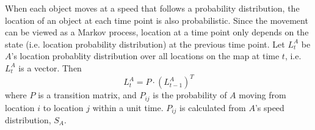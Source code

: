 When each object moves at a speed that follows a probability distribution,
the location of an object at each time point is also probabilistic. Since
the movement can be viewed as a Markov process, location at a time point only
depends on the state (i.e. location probability distribution) at the 
previous time point. Let $L_t^A$ be $A$'s location probablity distribution
over all locations on the map at time $t$, i.e. $L_t^A$ is a vector.
Then
\begin{equation}
\label{eqn:trans}
L_t^A = P \cdot (L_{t-1}^A)^T 
\end{equation}
where $P$ is a transition matrix, and $P_{ij}$ is the probability of $A$ 
moving from location $i$ to location $j$ within a unit time. 
$P_{ij}$ is calculated from $A$'s speed distribution, $S_A$.




